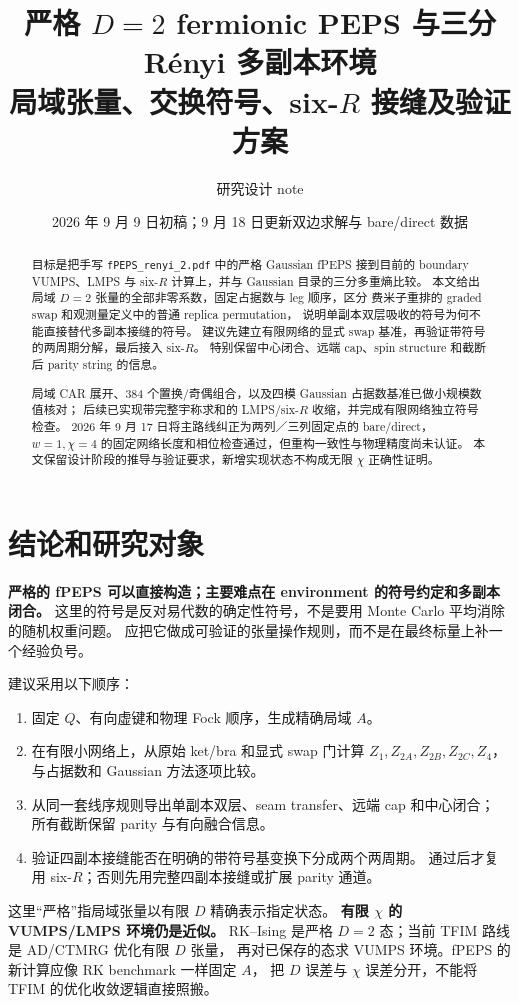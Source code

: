 \documentclass[11pt]{article}
\title{严格 $D=2$ fermionic PEPS 与三分 Rényi 多副本环境\\
\large 局域张量、交换符号、six-$R$ 接缝及验证方案}
\author{研究设计 note}
\date{2026 年 9 月 9 日初稿；9 月 18 日更新双边求解与 bare/direct 数据}
\newcommand{\code}[1]{\texttt{\small #1}}
\begin{document}
\maketitle
\begin{abstract}
目标是把手写 \code{fPEPS\_renyi\_2.pdf} 中的严格 Gaussian fPEPS 接到目前的
boundary VUMPS、LMPS 与 six-$R$ 计算上，并与 Gaussian 目录的三分多重熵比较。
本文给出局域 $D=2$ 张量的全部非零系数，固定占据数与 leg 顺序，区分
费米子重排的 graded swap 和观测量定义中的普通 replica permutation，
说明单副本双层吸收的符号为何不能直接替代多副本接缝的符号。
建议先建立有限网络的显式 swap 基准，再验证带符号的两周期分解，最后接入 six-$R$。
特别保留中心闭合、远端 cap、spin structure 和截断后 parity string 的信息。

局域 CAR 展开、384 个置换/奇偶组合，以及四模 Gaussian 占据数基准已做小规模数值核对；
后续已实现带完整宇称求和的 LMPS/six-$R$ 收缩，并完成有限网络独立符号检查。
2026 年 9 月 17 日将主路线纠正为两列／三列固定点的 bare/direct，
$w=1,\chi=4$ 的固定网络长度和相位检查通过，但重构一致性与物理精度尚未认证。
本文保留设计阶段的推导与验证要求，新增实现状态不构成无限 $\chi$ 正确性证明。
\end{abstract}
\tableofcontents
\newpage

\section{结论和研究对象}

\textbf{严格的 fPEPS 可以直接构造；主要难点在 environment 的符号约定和多副本闭合。}
这里的符号是反对易代数的确定性符号，不是要用 Monte Carlo 平均消除的随机权重问题。
应把它做成可验证的张量操作规则，而不是在最终标量上补一个经验负号。

建议采用以下顺序：
\begin{enumerate}
\item 固定 $Q$、有向虚键和物理 Fock 顺序，生成精确局域 $A$。
\item 在有限小网络上，从原始 ket/bra 和显式 swap 门计算
      $Z_1,Z_{2A},Z_{2B},Z_{2C},Z_4$，与占据数和 Gaussian 方法逐项比较。
\item 从同一套线序规则导出单副本双层、seam transfer、远端 cap 和中心闭合；
      所有截断保留 parity 与有向融合信息。
\item 验证四副本接缝能否在明确的带符号基变换下分成两个两周期。
      通过后才复用 six-$R$；否则先用完整四副本接缝或扩展 parity 通道。
\end{enumerate}

这里“严格”指局域张量以有限 $D$ 精确表示指定状态。
\textbf{有限 $\chi$ 的 VUMPS/LMPS 环境仍是近似。}
RK--Ising 是严格 $D=2$ 态；当前 TFIM 路线是 AD/CTMRG 优化有限 $D$ 张量，
再对已保存的态求 VUMPS 环境。fPEPS 的新计算应像 RK benchmark 一样固定 $A$，
把 $D$ 误差与 $\chi$ 误差分开，不能将 TFIM 的优化收敛逻辑直接照搬。
\end{document}
